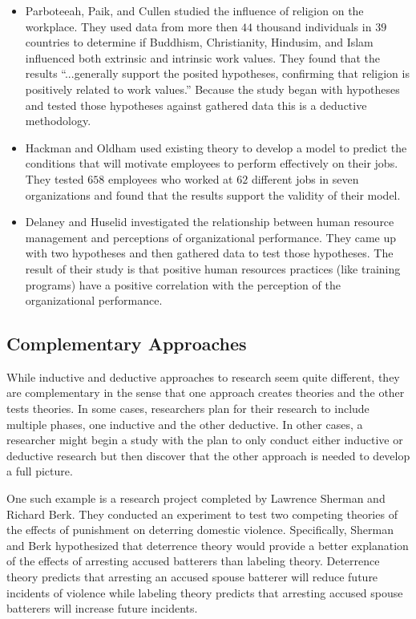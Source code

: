 \begin{itemize}
	\item Parboteeah, Paik, and Cullen\cite{parboteeah2009religious} studied the influence of religion on the workplace. They used data from more then $ 44 $ thousand individuals in $ 39 $ countries to determine if Buddhism, Christianity, Hindusim, and Islam influenced both extrinsic and intrinsic work values. They found that the results ``...generally support the posited hypotheses, confirming that religion is positively related to work values.'' Because the study began with hypotheses and tested those hypotheses against gathered data this is a deductive methodology.

	\item Hackman and Oldham\cite{hackman1976motivation} used existing theory to develop a model to predict the conditions that will motivate employees to perform effectively on their jobs. They tested $ 658 $ employees who worked at $ 62 $ different jobs in seven organizations and found that the results support the validity of their model.

	\item Delaney and Huselid\cite{delaney1996impact} investigated the relationship between human resource management and perceptions of organizational performance. They came up with two hypotheses and then gathered data to test those hypotheses. The result of their study is that positive human resources practices (like training programs) have a positive correlation with the perception of the organizational performance. 
\end{itemize}

\subsection{Complementary Approaches}

While inductive and deductive approaches to research seem quite different, they are complementary in the sense that one approach creates theories and the other tests theories. In some cases, researchers plan for their research to include multiple phases, one inductive and the other deductive. In other cases, a researcher might begin a study with the plan to only conduct either inductive or deductive research but then discover that the other approach is needed to develop a full picture.

One such example is a research project completed by Lawrence Sherman and Richard Berk\cite{sherman1984specific}. They conducted an experiment to test two competing theories of the effects of punishment on deterring domestic violence. Specifically, Sherman and Berk hypothesized that deterrence theory would provide a better explanation of the effects of arresting accused batterers than labeling theory. Deterrence theory predicts that arresting an accused spouse batterer will reduce future incidents of violence while labeling theory predicts that arresting accused spouse batterers will increase future incidents. 

